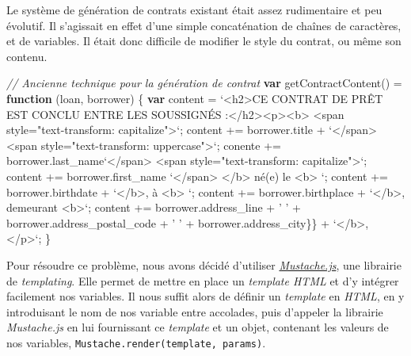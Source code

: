 \documentclass[12pt,a4paper]{article}
\newenvironment{Shaded}{}{}
\newcommand{\KeywordTok}[1]{\textcolor[rgb]{0.00,0.44,0.13}{\textbf{{#1}}}}
\newcommand{\StringTok}[1]{\textcolor[rgb]{0.25,0.44,0.63}{{#1}}}
\newcommand{\VerbatimStringTok}[1]{\textcolor[rgb]{0.25,0.44,0.63}{{#1}}}
\newcommand{\CommentTok}[1]{\textcolor[rgb]{0.38,0.63,0.69}{\textit{{#1}}}}
\newcommand{\VariableTok}[1]{\textcolor[rgb]{0.10,0.09,0.49}{{#1}}}
\newcommand{\OperatorTok}[1]{\textcolor[rgb]{0.40,0.40,0.40}{{#1}}}
\newcommand{\AttributeTok}[1]{\textcolor[rgb]{0.49,0.56,0.16}{{#1}}}
\newcommand{\NormalTok}[1]{{#1}}
\begin{document}
  Le système de génération de contrats existant était assez rudimentaire
  et peu évolutif. Il s'agissait en effet d'une simple concaténation de
  chaînes de caractères, et de variables. Il était donc difficile de
  modifier le style du contrat, ou même son contenu.

  \begin{Shaded}
  \begin{Highlighting}[]
  \CommentTok{// Ancienne technique pour la génération de contrat}
  \KeywordTok{var} \AttributeTok{getContractContent}\NormalTok{() }\OperatorTok{=} \KeywordTok{function} \NormalTok{(loan}\OperatorTok{,} \NormalTok{borrower) }\OperatorTok{\{}
    \KeywordTok{var} \NormalTok{content }\OperatorTok{=} \VerbatimStringTok{`<h2>CE CONTRAT DE PRÊT EST CONCLU}
  \VerbatimStringTok{    ENTRE LES SOUSSIGNÉS :</h2><p><b>}
  \VerbatimStringTok{    <span style="text-transform: capitalize">`}\OperatorTok{;}
    \NormalTok{content }\OperatorTok{+=} \VariableTok{borrower}\NormalTok{.}\AttributeTok{title} \OperatorTok{+} \VerbatimStringTok{`</span>}
  \VerbatimStringTok{   <span style="text-transform: uppercase">`}\OperatorTok{;}
    \NormalTok{conente }\OperatorTok{+=} \VariableTok{borrower}\NormalTok{.}\AttributeTok{last_name}\VerbatimStringTok{`</span>}
  \VerbatimStringTok{   <span style="text-transform: capitalize">`}\OperatorTok{;}
    \NormalTok{content }\OperatorTok{+=} \VariableTok{borrower}\NormalTok{.}\AttributeTok{first_name} \VerbatimStringTok{`</span>}
  \VerbatimStringTok{    </b> né(e) le <b> `}\OperatorTok{;}
    \NormalTok{content }\OperatorTok{+=} \VariableTok{borrower}\NormalTok{.}\AttributeTok{birthdate} \OperatorTok{+} \VerbatimStringTok{`</b>, à <b> `}\OperatorTok{;}
    \NormalTok{content }\OperatorTok{+=} \VariableTok{borrower}\NormalTok{.}\AttributeTok{birthplace} \OperatorTok{+} \VerbatimStringTok{`</b>, demeurant <b>`}\OperatorTok{;}
    \NormalTok{content }\OperatorTok{+=} \VariableTok{borrower}\NormalTok{.}\AttributeTok{address_line} \OperatorTok{+} \StringTok{' '}
      \OperatorTok{+} \VariableTok{borrower}\NormalTok{.}\AttributeTok{address_postal_code} \OperatorTok{+} \StringTok{' '}
      \OperatorTok{+}  \VariableTok{borrower}\NormalTok{.}\AttributeTok{address_city}\OperatorTok{\}}\NormalTok{\} }\OperatorTok{+} \VerbatimStringTok{`</b>, </p>`}\OperatorTok{;}
  \NormalTok{\}}
  \end{Highlighting}
  \end{Shaded}

  \bigskip

  Pour résoudre ce problème, nous avons décidé d'utiliser
  \href{https://github.com/janl/mustache.js}{\emph{Mustache.js}}, une
  librairie de \emph{templating}. Elle permet de mettre en place un
  \emph{template HTML} et d'y intégrer facilement nos variables. Il nous
  suffit alors de définir un \emph{template} en \emph{HTML}, en y
  introduisant le nom de nos variable entre accolades, puis d'appeler la
  librairie \emph{Mustache.js} en lui fournissant ce \emph{template} et un
  objet, contenant les valeurs de nos variables,
  \texttt{Mustache.render(template,\ params)}.
\end{document}
